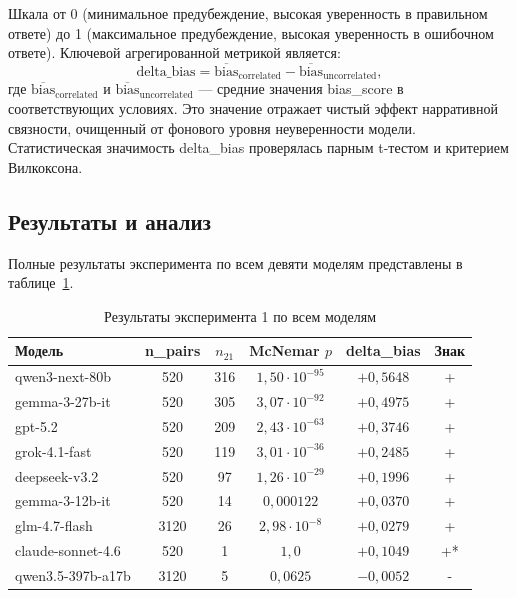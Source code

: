 Шкала от 0 (минимальное предубеждение, высокая уверенность в правильном ответе) до 1 (максимальное предубеждение, высокая уверенность в ошибочном ответе). Ключевой агрегированной метрикой является:
\begin{equation}
  \text{delta\_bias} = \overline{\text{bias}}_{\text{correlated}} - \overline{\text{bias}}_{\text{uncorrelated}},
  \label{eq:delta_bias}
\end{equation}
где $\overline{\text{bias}}_{\text{correlated}}$ и $\overline{\text{bias}}_{\text{uncorrelated}}$ --- средние значения bias\_score в соответствующих условиях. Это значение отражает чистый эффект нарративной связности, очищенный от фонового уровня неуверенности модели. Статистическая значимость delta\_bias проверялась парным t-тестом и критерием Вилкоксона.

\subsection{Результаты и анализ}

Полные результаты эксперимента по всем девяти моделям представлены в таблице~\ref{tab:linda_results}.

\begin{table}[h!]
\caption{Результаты эксперимента 1 по всем моделям}
\label{tab:linda_results}
\centering
\begin{tabular}{|l|c|c|c|c|c|}
\hline
\textbf{Модель} & \textbf{n\_pairs} & \textbf{$n_{21}$} & \textbf{McNemar $p$} & \textbf{delta\_bias} & \textbf{Знак} \\
\hline
qwen3-next-80b   & 520  & 316 & $1{,}50 \cdot 10^{-95}$ & $+0{,}5648$ & + \\
gemma-3-27b-it   & 520  & 305 & $3{,}07 \cdot 10^{-92}$ & $+0{,}4975$ & + \\
gpt-5.2          & 520  & 209 & $2{,}43 \cdot 10^{-63}$ & $+0{,}3746$ & + \\
grok-4.1-fast    & 520  & 119 & $3{,}01 \cdot 10^{-36}$ & $+0{,}2485$ & + \\
deepseek-v3.2    & 520  & 97  & $1{,}26 \cdot 10^{-29}$ & $+0{,}1996$ & + \\
gemma-3-12b-it   & 520  & 14  & $0{,}000122$            & $+0{,}0370$ & + \\
glm-4.7-flash    & 3120 & 26  & $2{,}98 \cdot 10^{-8}$  & $+0{,}0279$ & + \\
claude-sonnet-4.6 & 520 & 1   & $1{,}0$                 & $+0{,}1049$ & +* \\
qwen3.5-397b-a17b & 3120 & 5  & $0{,}0625$              & $-0{,}0052$ & - \\
\hline
\end{tabular}
\end{table}


